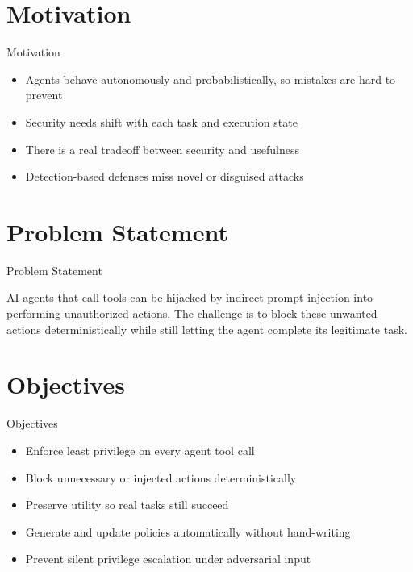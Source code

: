 \documentclass[10pt]{beamer}
\begin{document}
\section{Motivation}
\begin{frame}{Motivation}
\begin{itemize}
  \item Agents behave autonomously and probabilistically, so mistakes are hard to prevent
  \item Security needs shift with each task and execution state
  \item There is a real tradeoff between security and usefulness
  \item Detection-based defenses miss novel or disguised attacks
\end{itemize}
\end{frame}

\section{Problem Statement}
\begin{frame}{Problem Statement}
  \begin{block}{}
  AI agents that call tools can be hijacked by indirect prompt injection into performing unauthorized actions. The challenge is to block these unwanted actions deterministically while still letting the agent complete its legitimate task.
  \end{block}
\end{frame}

\section{Objectives}
\begin{frame}{Objectives}
\begin{itemize}
  \item Enforce least privilege on every agent tool call
  \item Block unnecessary or injected actions deterministically
  \item Preserve utility so real tasks still succeed
  \item Generate and update policies automatically without hand-writing
  \item Prevent silent privilege escalation under adversarial input
\end{itemize}
\end{frame}
\end{document}
